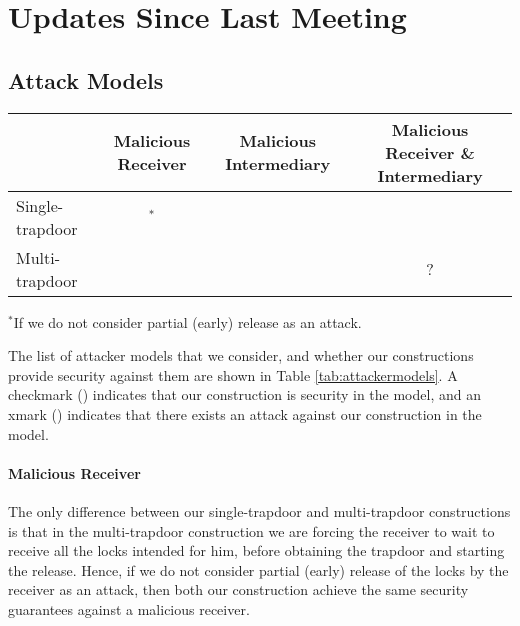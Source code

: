 \section{Updates Since Last Meeting}

\subsection{Attack Models}
\label{sec:attackermodels}

\begin{table*}[htb]
	\centering
	\begin{tabular}{|l|c|c|c|} \hline
		&	Malicious Receiver	&	Malicious Intermediary	&	Malicious Receiver \& Intermediary \\ \hline
		Single-trapdoor & {\cmark$^*$} & \xmark & \xmark \\ \hline
		Multi-trapdoor 	& \cmark & \cmark & ? \\ \hline
	\end{tabular}
	
	{\footnotesize $^*$If we do not consider partial (early) release as an attack.}
	\label{tab:attackermodels}
	\caption{Attack models against our constructions.}
\end{table*}

The list of attacker models that we consider, and whether our constructions provide security 
against them are shown in Table \ref{tab:attackermodels}. A checkmark (\cmark) indicates that our 
construction is security in the model, and an xmark (\xmark) indicates that there exists an 
attack against our construction in the model.

\paragraph{Malicious Receiver} The only difference between our single-trapdoor and 
multi-trapdoor constructions is that in the multi-trapdoor construction we are forcing 
the receiver to wait to receive all the locks intended for him, before obtaining the 
trapdoor and starting the release. Hence, if we do not consider partial (early) release 
of the locks by the receiver as an attack, then both our construction achieve the same 
security guarantees against a malicious receiver.


